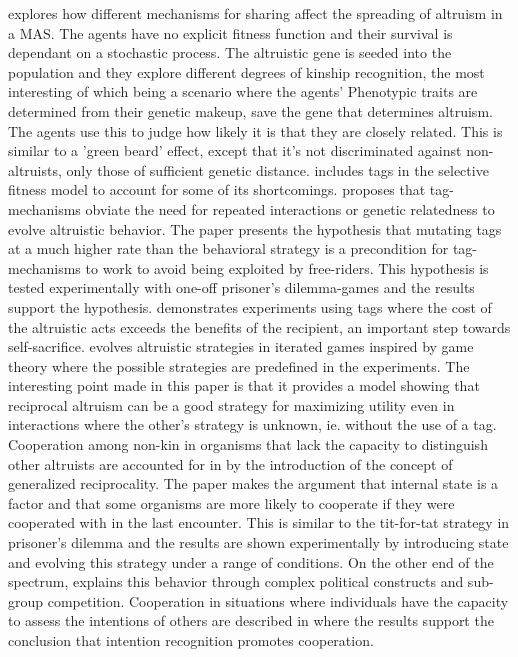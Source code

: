 \documentclass[a4paper]{book}
\begin{document}
\cite{turner_stochastic_2003} explores how different mechanisms for sharing affect the spreading of altruism in a MAS. The agents have no explicit fitness function and their survival is dependant on a stochastic process. The altruistic gene is seeded into the population and they explore different degrees of kinship recognition, the most interesting of which being a scenario where the agents' Phenotypic traits are determined from their genetic makeup, save the gene that determines altruism. The agents use this to judge how likely it is that they are closely related. This is similar to a 'green beard' effect, except that it's not discriminated against non-altruists, only those of sufficient genetic distance.
\cite{ozisik_effects_2012} includes tags in the selective fitness model to account for some of its shortcomings.
\cite{hales_change_2005} proposes that tag-mechanisms obviate the need for repeated interactions or genetic relatedness to evolve altruistic behavior. The paper presents the hypothesis that mutating tags at a much higher rate than the behavioral strategy is a precondition for tag-mechanisms to work to avoid being exploited by free-riders. This hypothesis is tested experimentally with one-off prisoner's dilemma-games and the results support the hypothesis.
\cite{spector_genetic_2006} demonstrates experiments using tags where the cost of the altruistic acts exceeds the benefits of the recipient, an important step towards self-sacrifice.
\cite{mayoh_evolution_2000-1} evolves altruistic strategies in iterated games inspired by game theory where the possible strategies are predefined in the experiments. The interesting point made in this paper is that it provides a model showing that reciprocal altruism can be a good strategy for maximizing utility even in interactions where the other's strategy is unknown, ie. without the use of a tag. 
Cooperation among non-kin in organisms that lack the capacity to distinguish other altruists are accounted for in \cite{barta_cooperation_2010} by the introduction of the concept of generalized reciprocality. The paper makes the argument that internal state is a factor and that some organisms are more likely to cooperate if they were cooperated with in the last encounter. This is similar to the tit-for-tat strategy in prisoner's dilemma and the results are shown experimentally by introducing state and evolving this strategy under a range of conditions.
On the other end of the spectrum, \cite{dessalles_coalition_1999} explains this behavior through complex political constructs and sub-group competition. Cooperation in situations where individuals have the capacity to assess the intentions of others are described in \cite{han_role_2011} where the results support the conclusion that intention recognition promotes cooperation.
\end{document}
